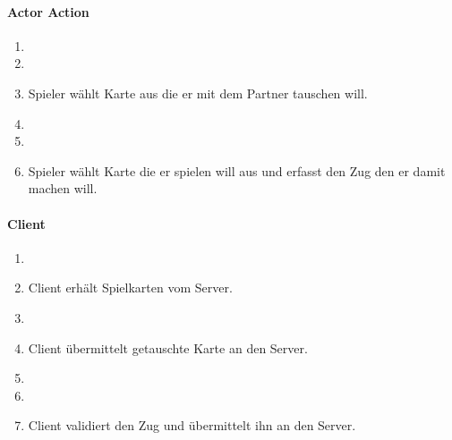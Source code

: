 \documentclass[a4paper,12pt,halfparskip,DIV14]{scrartcl}
\begin{document}
\begin{multicols}{3}
\raggedcolumns \centering
\paragraph{Actor Action}
\begin{enumerate}
	\item[] \vspace{1 \lineheight}
	\item[] \vspace{1 \lineheight}
	\item[3] Spieler wählt Karte aus die er mit dem Partner tauschen will.
	\item[] \vspace{2 \lineheight}
	\item[] \vspace{4 \lineheight}
	\item[6] Spieler wählt Karte die er spielen will aus und erfasst den Zug den er damit machen will.
\end{enumerate}
\columnbreak
\paragraph{Client}
\begin{enumerate}
	\item[] \vspace{1 \lineheight}
	\item[2] Client erhält Spielkarten vom Server.
	\item[] \vspace{2 \lineheight}
	\item[4] Client übermittelt getauschte Karte an den Server.
	\item[] \vspace{4 \lineheight}
	\item[] \vspace{3 \lineheight}
	\item[7] Client validiert den Zug und übermittelt ihn an den Server.
\end{enumerate}
\columnbreak

\end{multicols}
\end{document}
